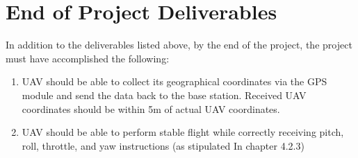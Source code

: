 \documentclass[english]{upeeei}
\begin{document}
\section{End of Project Deliverables}
In addition to the deliverables listed above, by the end of the project, the project must have accomplished
the following:
\begin{enumerate}
    \item UAV should be able to collect its geographical coordinates via the GPS module and send the data back to the base station. Received UAV
        coordinates should be within 5m of actual UAV coordinates.
    \item UAV should be able to perform stable flight while correctly receiving pitch, roll, throttle, and yaw instructions (as stipulated In
        chapter 4.2.3)
\end{enumerate}
\printbibliography[
heading=bibintoc,
title={Bibliography}
]
\end{document}
